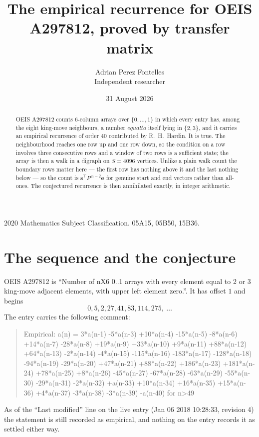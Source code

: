 \documentclass[11pt,a4paper]{article}
\title{The empirical recurrence for OEIS A297812, proved by transfer matrix}
\author{Adrian Perez Fontelles\\ \small Independent researcher}
\date{31 August 2026}
\theoremstyle{plain}
\theoremstyle{definition}
\begin{document}
\maketitle

\begin{abstract}
OEIS A297812 counts $6$-column arrays over $\{0,\dots,1\}$ in which every entry has,
among the eight king-move neighbours, a number $equal to$ itself lying in $\{2,3\}$, and it carries an empirical
recurrence of order $40$ contributed by R.~H.~Hardin. It is true. The neighbourhood
reaches one row up and one row down, so the condition on a row involves three consecutive
rows and a window of two rows is a sufficient state; the array is then a walk in a digraph
on $S=4096$ vertices. Unlike a plain walk count the boundary rows matter here --- the first
row has nothing above it and the last nothing below --- so the count is
$\mathbf{s}^{\!\top}P^{\,n-2}\mathbf{e}$ for genuine start and end vectors rather than
all-ones. The conjectured recurrence is then annihilated exactly, in integer arithmetic.
\end{abstract}

\noindent\small 2020 Mathematics Subject Classification. 05A15, 05B50, 15B36.\normalsize

\section{The sequence and the conjecture}

OEIS A297812 is ``Number of nX6 0..1 arrays with every element equal to 2 or 3 king-move adjacent elements, with upper left element zero.''. It has offset
$1$ and begins
\[
0, 5, 2, 27, 41, 83, 114, 275,\ \dots
\]
The entry carries the following comment:
\begin{quote}\small
Empirical: a(n) = 3*a(n-1) -5*a(n-3) +10*a(n-4) -15*a(n-5) -8*a(n-6) +14*a(n-7) -28*a(n-8) +19*a(n-9) +33*a(n-10) +9*a(n-11) +88*a(n-12) +64*a(n-13) -2*a(n-14) -4*a(n-15) -115*a(n-16) -183*a(n-17) -128*a(n-18) -94*a(n-19) -29*a(n-20) +47*a(n-21) +88*a(n-22) +186*a(n-23) +181*a(n-24) +78*a(n-25) +8*a(n-26) -45*a(n-27) -67*a(n-28) -63*a(n-29) -55*a(n-30) -29*a(n-31) -2*a(n-32) +a(n-33) +10*a(n-34) +16*a(n-35) +15*a(n-36) +4*a(n-37) -3*a(n-38) -3*a(n-39) -a(n-40) for n>49
\end{quote}
As of the ``Last modified'' line on the live entry (Jan 06 2018 10:28:33, revision
4) the statement is still recorded as empirical, and nothing on the entry
records it as settled either way.
\end{document}
